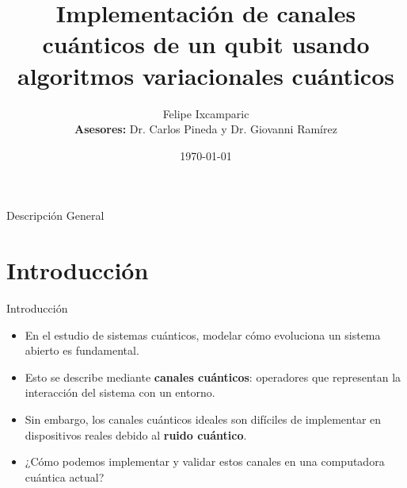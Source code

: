 \documentclass[aspectratio=169,xcolor=dvipsnames]{beamer}
\title{Implementación de canales cuánticos de un qubit usando algoritmos variacionales cuánticos}
\author{Felipe Ixcamparic \\
\textbf{Asesores:} Dr. Carlos Pineda y Dr. Giovanni Ramírez}
\institute
{
    Escuela de Ciencias Físicas y Matemáticas \\
    Universidad de San Carlos de Guatemala \\ 
    Instituto de Física \\
    Universidad Nacional Autónoma de México %
}
\date{\today} %
\begin{document}
\begin{frame}
    \titlepage
\end{frame}

\begin{frame}{Descripción General}
    \tableofcontents
\end{frame}

\section{Introducción}

\begin{frame}{Introducción}
\vspace{-0.4em}
\begin{itemize}
    \item En el estudio de sistemas cuánticos, modelar cómo evoluciona un sistema abierto es fundamental.
    
    \medskip
    \item Esto se describe mediante \textbf{canales cuánticos}: operadores que representan la interacción del sistema con un entorno.

    \medskip
    \item Sin embargo, los canales cuánticos ideales son difíciles de implementar en dispositivos reales debido al \textbf{ruido cuántico}.

    \medskip
    \item ¿Cómo podemos implementar y validar estos canales en una computadora cuántica actual?
\end{itemize}
\end{frame}

\end{document}
